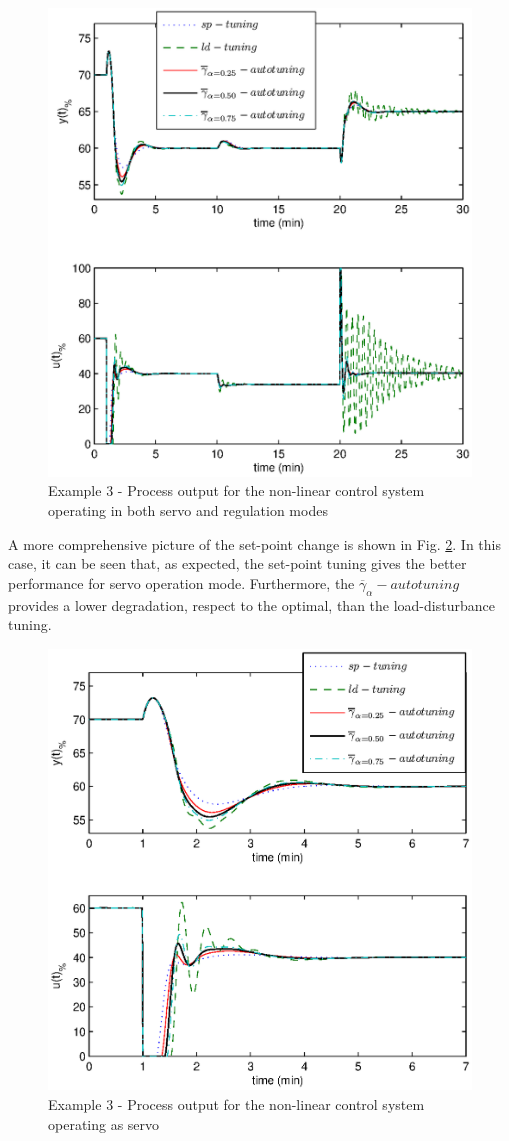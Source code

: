 \begin{figure}[htb!]
    \begin{center}
        \includegraphics[width=0.7\linewidth]{y3outp1.eps}
       \caption{Example 3 - Process output for the non-linear control system operating in both servo and regulation modes} \label{y31}
    \end{center}
\end{figure}

A more comprehensive picture of the set-point change is shown in
Fig. \ref{y32}. In this case, it can be seen that, as expected,
the set-point tuning gives the better performance for servo
operation mode. Furthermore, the
$\overline{\gamma}_{\alpha}-autotuning$ provides a lower
degradation, respect to the optimal, than the load-disturbance
tuning.

\begin{figure}[htb!]
    \begin{center}
        \includegraphics[width=0.7\linewidth]{y3outp2.eps}
       \caption{Example 3 - Process output for the non-linear control system operating as servo} \label{y32}
    \end{center}
\end{figure}

